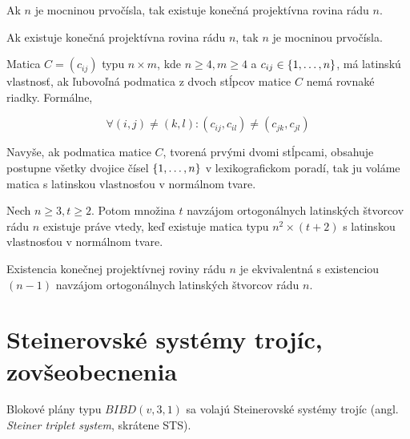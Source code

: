 \begin{theorem_hard}
Ak $n$ je mocninou prvočísla, tak existuje konečná projektívna rovina rádu $n$.
\end{theorem_hard}

\begin{hypothesis}
Ak existuje konečná projektívna rovina rádu $n$, tak $n$ je mocninou prvočísla.
\end{hypothesis}

\begin{definition}

Matica $C = (c_{ij})$ typu $n \times m$, kde $n \geq 4, m \geq 4$ a $c_{ij} \in \left\{1, \ldots, n\right\}$,  
má latinskú vlastnosť, ak ľubovoľná podmatica z dvoch stĺpcov matice $C$ nemá rovnaké riadky. Formálne,

$$\forall (i, j) \neq (k, l): (c_{ij}, c_{il}) \neq (c_{jk}, c_{jl})$$

Navyše, ak podmatica matice $C$, tvorená prvými dvomi stĺpcami, obsahuje postupne všetky dvojice čísel $\left\{1, \ldots, n\right\}$
v lexikografickom poradí, tak ju voláme matica s latinskou vlastnosťou v normálnom tvare.
\end{definition}

\begin{theorem}
Nech $n \geq 3, t \geq 2$. Potom množina $t$ navzájom ortogonálnych latinských štvorcov rádu $n$ existuje práve vtedy,
keď existuje matica typu $n^2 \times (t+2)$ s latinskou vlastnosťou v normálnom tvare.
\end{theorem}

\begin{theorem}
Existencia konečnej projektívnej roviny rádu $n$ je ekvivalentná s existenciou $(n-1)$ navzájom ortogonálnych latinských štvorcov rádu $n$.
\end{theorem}

\begin{construction}
\TODO
\end{construction}

\section{Steinerovské systémy trojíc, zovšeobecnenia}

\begin{definition}
Blokové plány typu $BIBD(v, 3, 1)$ sa volajú Steinerovské systémy trojíc (angl. \emph{Steiner triplet system}, skrátene STS).
\end{definition}

